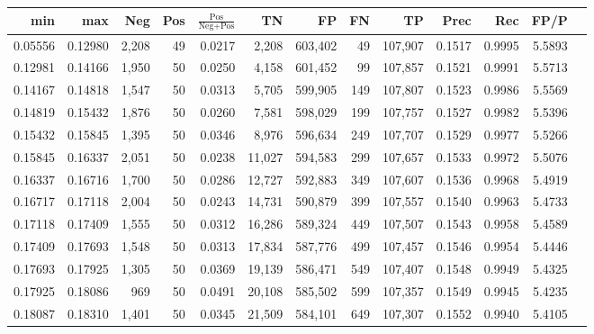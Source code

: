 \begin{tabular}{rrrrrrrrrrrrr}
\toprule
    min &     max &   Neg & Pos & $\frac{\text{Pos}}{\text{Neg}+\text{Pos}}$ &      TN &      FP &      FN &      TP &   Prec &    Rec &   FP/P \\
\midrule
0.05556 & 0.12980 & 2,208 &  49 &                                     0.0217 &   2,208 & 603,402 &      49 & 107,907 & 0.1517 & 0.9995 & 5.5893 \\
0.12981 & 0.14166 & 1,950 &  50 &                                     0.0250 &   4,158 & 601,452 &      99 & 107,857 & 0.1521 & 0.9991 & 5.5713 \\
0.14167 & 0.14818 & 1,547 &  50 &                                     0.0313 &   5,705 & 599,905 &     149 & 107,807 & 0.1523 & 0.9986 & 5.5569 \\
0.14819 & 0.15432 & 1,876 &  50 &                                     0.0260 &   7,581 & 598,029 &     199 & 107,757 & 0.1527 & 0.9982 & 5.5396 \\
0.15432 & 0.15845 & 1,395 &  50 &                                     0.0346 &   8,976 & 596,634 &     249 & 107,707 & 0.1529 & 0.9977 & 5.5266 \\
0.15845 & 0.16337 & 2,051 &  50 &                                     0.0238 &  11,027 & 594,583 &     299 & 107,657 & 0.1533 & 0.9972 & 5.5076 \\
0.16337 & 0.16716 & 1,700 &  50 &                                     0.0286 &  12,727 & 592,883 &     349 & 107,607 & 0.1536 & 0.9968 & 5.4919 \\
0.16717 & 0.17118 & 2,004 &  50 &                                     0.0243 &  14,731 & 590,879 &     399 & 107,557 & 0.1540 & 0.9963 & 5.4733 \\
0.17118 & 0.17409 & 1,555 &  50 &                                     0.0312 &  16,286 & 589,324 &     449 & 107,507 & 0.1543 & 0.9958 & 5.4589 \\
0.17409 & 0.17693 & 1,548 &  50 &                                     0.0313 &  17,834 & 587,776 &     499 & 107,457 & 0.1546 & 0.9954 & 5.4446 \\
0.17693 & 0.17925 & 1,305 &  50 &                                     0.0369 &  19,139 & 586,471 &     549 & 107,407 & 0.1548 & 0.9949 & 5.4325 \\
0.17925 & 0.18086 &   969 &  50 &                                     0.0491 &  20,108 & 585,502 &     599 & 107,357 & 0.1549 & 0.9945 & 5.4235 \\
0.18087 & 0.18310 & 1,401 &  50 &                                     0.0345 &  21,509 & 584,101 &     649 & 107,307 & 0.1552 & 0.9940 & 5.4105 \\

\end{tabular}
